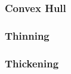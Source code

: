 \documentclass[a4paper,12pt]{article}
\begin{document}
\subsubsection{Convex Hull}


\subsubsection{Thinning}


\subsubsection{Thickening}


\end{document}

